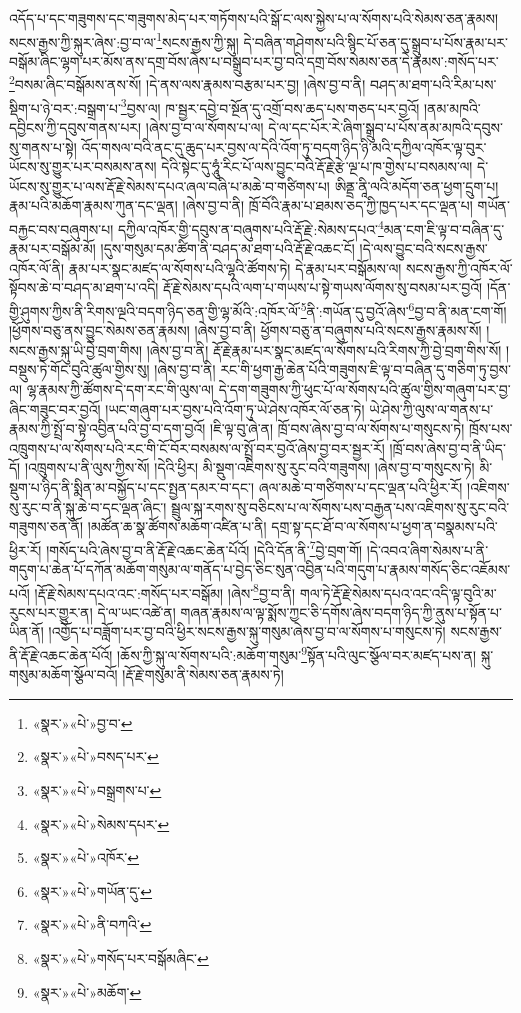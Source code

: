 འདོད་པ་དང་གཟུགས་དང་གཟུགས་མེད་པར་གཏོགས་པའི་སྒོ་ང་ལས་སྐྱེས་པ་ལ་སོགས་པའི་སེམས་ཅན་རྣམས། སངས་རྒྱས་ཀྱི་སྐུར་ཞེས་:བྱ་བ་ལ་\footnote{«སྣར་»«པེ་»བྱ་བ་}སངས་རྒྱས་ཀྱི་སྐུ། དེ་བཞིན་གཤེགས་པའི་སྙིང་པོ་ཅན་དུ་སྒྲུབ་པ་པོས་རྣམ་པར་བསྒོམ་ཞིང་ལྷག་པར་མོས་ནས་དགྲ་བོས་ཞེས་པ་བསྒྲུབ་པར་བྱ་བའི་དགྲ་བོས་སེམས་ཅན་དེ་རྣམས་:གསོད་པར་\footnote{«སྣར་»«པེ་»བསད་པར་}བསམ་ཞིང་བསྒོམས་ནས་སོ། །དེ་ནས་ལས་རྣམས་བརྩམ་པར་བྱ། །ཞེས་བྱ་བ་ནི། བཤད་མ་ཐག་པའི་རིམ་པས་སྡིག་པ་ཉེ་བར་:བསྒྲག་པ་\footnote{«སྣར་»«པེ་»བསྒྲགས་པ་}བྱས་ལ། ཁ་སྦྱར་དབྱེ་བ་སྔོན་དུ་འགྲོ་བས་ཆད་པས་གཅད་པར་བྱའོ། །ནམ་མཁའི་དབྱིངས་ཀྱི་དབུས་གནས་པར། །ཞེས་བྱ་བ་ལ་སོགས་པ་ལ། དེ་ལ་དང་པོར་རེ་ཞིག་སྒྲུབ་པ་པོས་ནམ་མཁའི་དབུས་སུ་གནས་པ་སྟེ། འོད་གསལ་བའི་ནང་དུ་ཆུད་པར་བྱས་ལ་དེའི་འོག་ཏུ་བདག་ཉིད་ཉི་མའི་དཀྱིལ་འཁོར་ལྟ་བུར་ཡོངས་སུ་གྱུར་པར་བསམས་ནས། དེའི་སྟེང་དུ་ཧཱུཾ་རིང་པོ་ལས་བྱུང་བའི་རྡོ་རྗེ་རྩེ་ལྔ་པ་ཁ་གྱེས་པ་བསམས་ལ། དེ་ཡོངས་སུ་གྱུར་པ་ལས་རྡོ་རྗེ་སེམས་དཔའ་ཞལ་བཞི་པ་མཆེ་བ་གཙིགས་པ། ཨིནྡྲ་ནཱི་ལའི་མདོག་ཅན་ཕྱག་དྲུག་པ། རྣམ་པའི་མཆོག་རྣམས་ཀུན་དང་ལྡན། །ཞེས་བྱ་བ་ནི། ཁྲོ་བོའི་རྣམ་པ་ཐམས་ཅད་ཀྱི་ཁྱད་པར་དང་ལྡན་པ། གཡོན་བརྐྱང་བས་བཞུགས་པ། དཀྱིལ་འཁོར་གྱི་དབུས་ན་བཞུགས་པའི་རྡོ་རྗེ་:སེམས་དཔའ་\footnote{«སྣར་»«པེ་»སེམས་དཔར་}མན་ངག་ཇི་ལྟ་བ་བཞིན་དུ་རྣམ་པར་བསྒོམ་མོ། །དུས་གསུམ་དམ་ཚིག་ནི་བཤད་མ་ཐག་པའི་རྡོ་རྗེ་འཆང་ངོ། །དེ་ལས་བྱུང་བའི་སངས་རྒྱས་འཁོར་ལོ་ནི། རྣམ་པར་སྣང་མཛད་ལ་སོགས་པའི་ལྷའི་ཚོགས་ཏེ། དེ་རྣམ་པར་བསྒོམས་ལ། སངས་རྒྱས་ཀྱི་འཁོར་ལོ་སྟོབས་ཆེ་བ་བཤད་མ་ཐག་པ་འདི། རྡོ་རྗེ་སེམས་དཔའི་ལག་པ་གཡས་པ་སྟེ་གཡས་ལོགས་སུ་བསམ་པར་བྱའོ། །དོན་གྱི་ཤུགས་ཀྱིས་ནི་རིགས་ལྔའི་བདག་ཉིད་ཅན་གྱི་ལྷ་མོའི་:འཁོར་ལོ་\footnote{«སྣར་»«པེ་»འཁོར་}ནི་:གཡོན་དུ་བྱའོ་ཞེས་\footnote{«སྣར་»«པེ་»གཡོན་དུ་}བྱ་བ་ནི་མན་ངག་གོ། །ཕྱོགས་བཅུ་ནས་བྱུང་སེམས་ཅན་རྣམས། །ཞེས་བྱ་བ་ནི། ཕྱོགས་བཅུ་ན་བཞུགས་པའི་སངས་རྒྱས་རྣམས་སོ། །སངས་རྒྱས་སྐུ་ཡི་བྱེ་བྲག་གིས། །ཞེས་བྱ་བ་ནི། རྡོ་རྗེ་རྣམ་པར་སྣང་མཛད་ལ་སོགས་པའི་རིགས་ཀྱི་བྱེ་བྲག་གིས་སོ། །བསྡུས་ཏེ་གོང་བུའི་ཚུལ་གྱིས་སུ། །ཞེས་བྱ་བ་ནི། རང་གི་ཕྱག་རྒྱ་ཆེན་པོའི་གཟུགས་ཇི་ལྟ་བ་བཞིན་དུ་གཅིག་ཏུ་བྱས་ལ། ལྷ་རྣམས་ཀྱི་ཚོགས་དེ་དག་རང་གི་ལུས་ལ། དེ་དག་གཟུགས་ཀྱི་ཕུང་པོ་ལ་སོགས་པའི་ཚུལ་གྱིས་གཞུག་པར་བྱ་ཞིང་གཟུང་བར་བྱའོ། །ཡང་གཞུག་པར་བྱས་པའི་འོག་ཏུ་ཡེ་ཤེས་འཁོར་ལོ་ཅན་ཏེ། ཡེ་ཤེས་ཀྱི་ལུས་ལ་གནས་པ་རྣམས་ཀྱི་སྤྲོ་བ་སྟེ་འབྱིན་པའི་བྱ་བ་དག་བྱའོ། །ཇི་ལྟ་བུ་ཞེ་ན། ཁྲོ་བས་ཞེས་བྱ་བ་ལ་སོགས་པ་གསུངས་ཏེ། ཁྲོས་པས་འཁྲུགས་པ་ལ་སོགས་པའི་རང་གི་ངོ་བོར་བསམས་ལ་སྤྲོ་བར་བྱའོ་ཞེས་བྱ་བར་སྦྱར་རོ། །ཁྲོ་བས་ཞེས་བྱ་བ་ནི་ཡིད་དོ། །འཁྲུགས་པ་ནི་ལུས་ཀྱིས་སོ། །དེའི་ཕྱིར། མི་སྡུག་འཇིགས་སུ་རུང་བའི་གཟུགས། །ཞེས་བྱ་བ་གསུངས་ཏེ། མི་སྡུག་པ་ཉིད་ནི་སྨིན་མ་བསྐྱོད་པ་དང་སྤྱན་དམར་བ་དང་། ཞལ་མཆེ་བ་གཙིགས་པ་དང་ལྡན་པའི་ཕྱིར་རོ། །འཇིགས་སུ་རུང་བ་ནི་སྐུ་ཆེ་བ་དང་ལྡན་ཞིང་། སྦྲུལ་སྐ་རགས་སུ་བཅིངས་པ་ལ་སོགས་པས་བརྒྱན་པས་འཇིགས་སུ་རུང་བའི་གཟུགས་ཅན་ནོ། །མཚོན་ཆ་སྣ་ཚོགས་མཆོག་འཛིན་པ་ནི། དགྲ་སྟ་དང་ཐོ་བ་ལ་སོགས་པ་ཕྱག་ན་བསྣམས་པའི་ཕྱིར་རོ། །གསོད་པའི་ཞེས་བྱ་བ་ནི་རྡོ་རྗེ་འཆང་ཆེན་པོའོ། །དེའི་དོན་ནི་\footnote{«སྣར་»«པེ་»ནི་བཀའི་}བྱེ་བྲག་གོ། །དེ་འབའ་ཞིག་སེམས་པ་ནི་གདུག་པ་ཆེན་པོ་དཀོན་མཆོག་གསུམ་ལ་གནོད་པ་བྱེད་ཅིང་སུན་འབྱིན་པའི་གདུག་པ་རྣམས་གསོད་ཅིང་འཇོམས་པའོ། །རྡོ་རྗེ་སེམས་དཔའ་འང་:གསོད་པར་བསྒོམ། །ཞེས་\footnote{«སྣར་»«པེ་»གསོད་པར་བསྒོམཞིང་}བྱ་བ་ནི། གལ་ཏེ་རྡོ་རྗེ་སེམས་དཔའ་འང་འདི་ལྟ་བུའི་མ་རུངས་པར་གྱུར་ན། དེ་ལ་ཡང་འཚེ་ན། གཞན་རྣམས་ལ་ལྟ་སྨོས་ཀྱང་ཅི་དགོས་ཞེས་བདག་ཉིད་ཀྱི་ནུས་པ་སྟོན་པ་ཡིན་ནོ། །འགྱོད་པ་བཟློག་པར་བྱ་བའི་ཕྱིར་སངས་རྒྱས་སྐུ་གསུམ་ཞེས་བྱ་བ་ལ་སོགས་པ་གསུངས་ཏེ། སངས་རྒྱས་ནི་རྡོ་རྗེ་འཆང་ཆེན་པོའོ། །ཆོས་ཀྱི་སྐུ་ལ་སོགས་པའི་:མཆོག་གསུམ་\footnote{«སྣར་»«པེ་»མཆོག་}སྟོན་པའི་ལུང་སྩོལ་བར་མཛད་པས་ན། སྐུ་གསུམ་མཆོག་སྩོལ་བའོ། །རྡོ་རྗེ་གསུམ་ནི་སེམས་ཅན་རྣམས་ཏེ། 